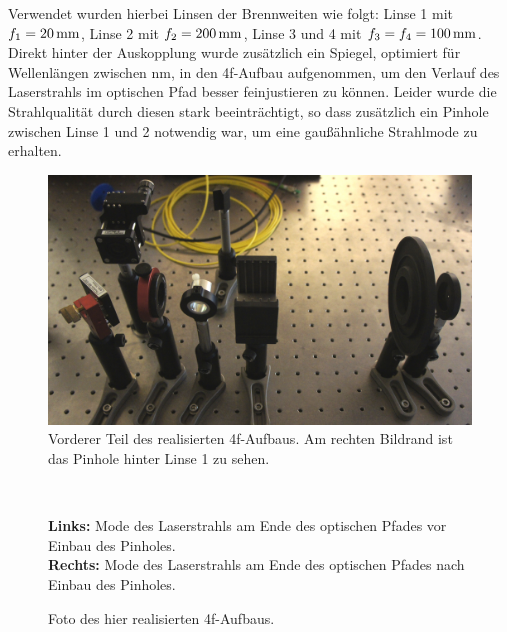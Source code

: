Verwendet wurden hierbei Linsen der Brennweiten wie folgt: Linse 1 mit $f_{1}=\unit[20]{mm}$, Linse 2 mit $f_{2}=\unit[200]{mm}$, Linse 3 und 4 mit $f_{3}=f_{4}=\unit[100]{mm}$. Direkt hinter der Auskopplung wurde zusätzlich ein Spiegel, optimiert für Wellenlängen zwischen \unit[400-700]{nm}, in den 4f-Aufbau aufgenommen, um den Verlauf des Laserstrahls im optischen Pfad besser feinjustieren zu können. Leider wurde die Strahlqualität durch diesen stark beeinträchtigt, so dass zusätzlich ein Pinhole zwischen Linse 1 und 2 notwendig war, um eine gaußähnliche Strahlmode zu erhalten.\\


\begin{figure}[h]
	\centering
	\includegraphics[width=0.7\linewidth]{images/4f-anfang.JPG}
	\caption[Vorderer Teil des 4f-Aufbaus]{
		Vorderer Teil des realisierten 4f-Aufbaus. Am rechten Bildrand ist das Pinhole hinter Linse 1 zu sehen.
	}
	\label{fig:_DSC7961}
\end{figure}
\begin{figure}
	\centering
	~
	\caption{
		\textbf{Links:} Mode des Laserstrahls am Ende des optischen Pfades vor Einbau des Pinholes.\\
		\textbf{Rechts:} Mode des Laserstrahls am Ende des optischen Pfades nach Einbau des Pinholes.
	}
	\label{fig:_DSC7988}
\end{figure}


\begin{figure}
	\centering
	\caption{Foto des hier realisierten 4f-Aufbaus.}
	\label{fig:_DSC7967}
\end{figure}


